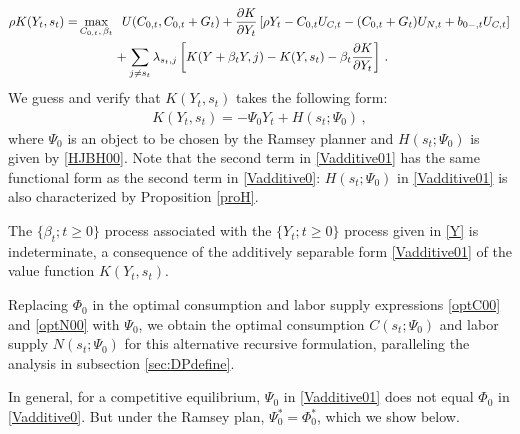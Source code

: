 \documentclass[12pt]{article}
\newcommand{\WJ}[1]{{\textcolor{red}{#1}}}
\begin{document}
\begin{align}\label{HJBV01} 
\rho K(Y_t, s_t) = &   \max_{C_{0, t} ,  \, \beta_t} \;\; U(C_{0, t}, C_{0, t}+G_t) 
+ \frac{\partial K }{\partial Y_t} \left[\rho Y_t- C_{0, t} U_{C, t}-(C_{0, t}+G_t) U_{N, t}+b_{0-, t} U_{C, t} \right]   \notag \\
& \quad\quad \;\;\,\, +\sum_{j\neq s_t} \lambda_{s_t, j}\left[K(Y+\beta_t Y, j)-K(Y, s_t) -\beta_t\frac{\partial K }{\partial Y_t} \right]	 \, . 
\end{align} 
%
%
We guess and  verify that $K(Y_t, s_t)$ takes the following  form:
\begin{eqnarray}\label{Vadditive01} 
K(Y_t, s_t)=-\Psi_0 Y_t+H(s_t; \Psi_0)\, ,
\end{eqnarray}
where $\Psi_0$ is an object to be chosen by the Ramsey planner and $H(s_t; \Psi_0)$ is given by \eqref{HJBH00}. %
Note that the second term in \eqref{Vadditive01} has the same functional form as the second term in \eqref{Vadditive0}: 
$H(s_t; \Psi_0)$ in \eqref{Vadditive01} is also characterized by Proposition \ref{proH}.


The $\{\beta_t; t\geq 0\}$ process  associated with the $\{Y_t; t\geq 0\}$ process given in \eqref{Y} is indeterminate, a consequence of  the additively separable form \eqref{Vadditive01} of the value function $K(Y_t, s_t)$. 

Replacing $\Phi_0$ in the optimal consumption and labor supply expressions \eqref{optC00} and \eqref{optN00} with $\Psi_0$, we obtain the optimal consumption $C(s_t; \Psi_0)$ and labor supply $N(s_t; \Psi_0)$ for this alternative recursive formulation, paralleling the analysis in subsection \ref{sec:DPdefine}. 

In general, for a competitive equilibrium, $\Psi_0$ in \eqref{Vadditive01} does not equal $\Phi_0$ in \eqref{Vadditive0}. But under the Ramsey plan, $\Psi_0^\ast=\Phi_0^\ast$, which we  show below. 
\end{document}
